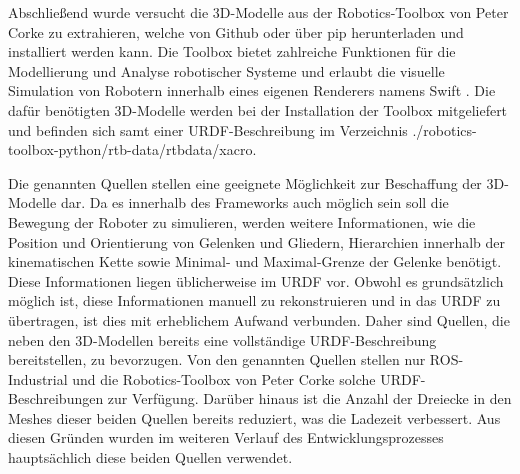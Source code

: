 Abschließend wurde versucht die 3D-Modelle aus der Robotics-Toolbox von Peter Corke zu extrahieren,
welche von Github oder über pip herunterladen und installiert werden kann.
Die Toolbox bietet zahlreiche Funktionen für die Modellierung und Analyse robotischer Systeme und erlaubt
die visuelle Simulation von Robotern innerhalb eines eigenen Renderers namens Swift .
Die dafür benötigten 3D-Modelle werden bei der Installation der Toolbox mitgeliefert und befinden sich samt einer URDF-Beschreibung
im Verzeichnis ./robotics-toolbox-python/rtb-data/rtbdata/xacro.

Die genannten Quellen stellen eine geeignete Möglichkeit zur Beschaffung der 3D-Modelle dar.
Da es innerhalb des Frameworks auch möglich sein soll die Bewegung der Roboter zu simulieren,
werden weitere Informationen, wie die Position und Orientierung von Gelenken und Gliedern,
Hierarchien innerhalb der kinematischen Kette sowie Minimal- und Maximal-Grenze der Gelenke benötigt.
Diese Informationen liegen üblicherweise im URDF vor.
Obwohl es grundsätzlich möglich ist, diese Informationen manuell zu rekonstruieren und in das URDF zu übertragen,
ist dies mit erheblichem Aufwand verbunden.
Daher sind Quellen, die neben den 3D-Modellen bereits eine vollständige URDF-Beschreibung bereitstellen, zu bevorzugen.
Von den genannten Quellen stellen nur ROS-Industrial und die Robotics-Toolbox von Peter Corke solche URDF-Beschreibungen zur Verfügung.
Darüber hinaus ist die Anzahl der Dreiecke in den Meshes dieser beiden Quellen bereits reduziert, was die Ladezeit verbessert.
Aus diesen Gründen wurden im weiteren Verlauf des Entwicklungsprozesses hauptsächlich diese beiden Quellen verwendet.



